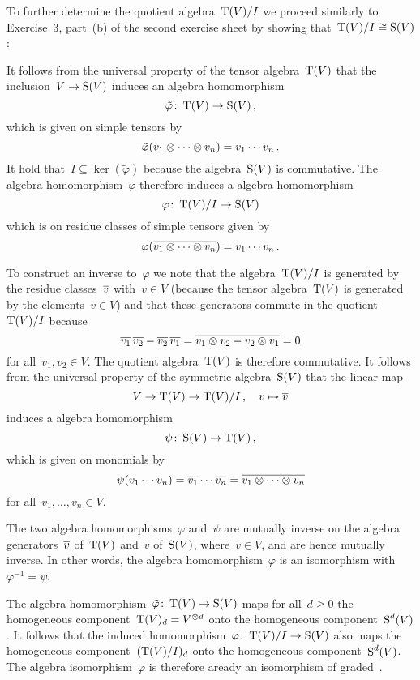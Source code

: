 To further determine the quotient algebra~$\operatorname{T}(V)/I$ we proceed similarly to Exercise~3, part~(b) of the second exercise sheet by showing that~$\operatorname{T}(V)/I \cong \operatorname{S}(V)$:

It follows from the universal property of the tensor algebra~$\operatorname{T}(V)$ that the inclusion~$V \to \operatorname{S}(V)$ induces an algebra homomorphism
\[
          \tilde{\varphi}
  \colon  \operatorname{T}(V)
  \to     \operatorname{S}(V) \,,
\]
which is given on simple tensors by
\[
    \tilde{\varphi}(v_1 \otimes \dotsb \otimes v_n)
  = v_1 \dotsm v_n \,.
\]
It hold that~$I \subseteq \ker(\tilde{\varphi})$ because the algebra~$\operatorname{S}(V)$ is commutative.
The algebra homomorphism~$\tilde{\varphi}$ therefore induces a {\welldef} algebra homomorphism
\[
          \varphi
  \colon  \operatorname{T}(V)/I
  \to     \operatorname{S}(V)
\]
which is on residue classes of simple tensors given by
\[
    \varphi( \overline{v_1 \otimes \dotsb \otimes v_n} )
  = v_1 \dotsm v_n \,.
\]

To construct an inverse to~$\varphi$ we note that the algebra~$\operatorname{T}(V)/I$ is generated by the residue classes~$\overline{v}$ with~$v \in V$ (because the tensor algebra~$\operatorname{T}(V)$ is generated by the elements~$v \in V$) and that these generators commute in the quotient~$\operatorname{T}(V)/I$ because
\[
    \overline{v_1} \, \overline{v_2} - \overline{v_2} \, \overline{v_1}
  = \overline{v_1 \otimes v_2 - v_2 \otimes v_1}
  = 0
\]
for all~$v_1, v_2 \in V$.
The quotient algebra~$\operatorname{T}(V)$ is therefore commutative.
It follows from the universal property of the symmetric algebra~$\operatorname{S}(V)$ that the linear map
\[
          V
  \to     \operatorname{T}(V)
  \to     \operatorname{T}(V)/I \,,
  \quad   v
  \mapsto \overline{v}
\]
induces a {\welldef} algebra homomorphism
\[
          \psi
  \colon  \operatorname{S}(V)
  \to     \operatorname{T}(V) \,,
\]
which is given on monomials by
\[
    \psi( v_1 \dotsm v_n )
  = \overline{v_1} \dotsm \overline{v_n}
  = \overline{v_1 \otimes \dotsb \otimes v_n}
\]
for all~$v_1, \dotsc, v_n \in V$.

The two algebra homomorphisms~$\varphi$ and~$\psi$ are mutually inverse on the algebra generators~$\overline{v}$ of~$\operatorname{T}(V)$ and~$v$ of~$\operatorname{S}(V)$, where~$v \in V$, and are hence mutually inverse.
In other words, the algebra homomorphism~$\varphi$ is an isomorphism with~$\varphi^{-1} = \psi$.

The algebra homomorphism~$\tilde{\varphi} \colon \operatorname{T}(V) \to \operatorname{S}(V)$ maps for all~$d \geq 0$ the homogeneous component~$\operatorname{T}(V)_d = V^{\otimes d}$ onto the homogeneous component~$\operatorname{S}^d(V)$.
It follows that the induced homomorphism~$\varphi \colon \operatorname{T}(V)/I \to \operatorname{S}(V)$ also maps the homogeneous component~$(\operatorname{T}(V)/I)_d$ onto the homogeneous component~$\operatorname{S}^d(V)$.
The algebra isomorphism~$\varphi$ is therefore aready an isomorphism of graded~{\kalgs}.

